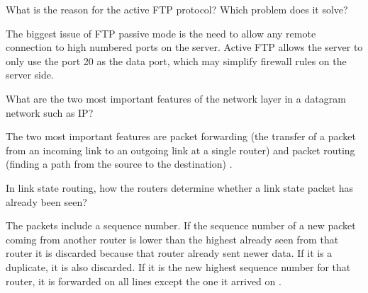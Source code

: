 \begin{Exercise}
\end{Exercise}

\begin{Exercise}
\end{Exercise}

\begin{Exercise}
What is the reason for the active FTP protocol? Which problem does it solve?
\end{Exercise}
\begin{Answer}
The biggest issue of FTP passive mode is the need to allow any remote connection to high numbered ports on the server. Active FTP allows the server to only use the port 20 as the data port, which may simplify firewall rules on the server side.
\end{Answer}

\begin{Exercise}
What are the two most important features of the network layer in a datagram network such as IP?
\end{Exercise}
\begin{Answer}
The two most important features are packet forwarding (the transfer of a packet from an incoming link to an outgoing link at a single router) and packet routing (finding a path from the source to the destination) \cite[p.~305]{computer-networking-kurose-2012}.
\end{Answer}

\begin{Exercise}
In link state routing, how the routers determine whether a link state packet has already been seen?
\end{Exercise}
\begin{Answer}
The packets include a sequence number. If the sequence number of a new packet coming from another router is lower than the highest already seen from that router it is discarded because that router already sent newer data. If it is a duplicate, it is also discarded. If it is the new highest sequence number for that router, it is forwarded on all lines except the one it arrived on \cite[p.~376]{computer-networks-tanenbaum-2012}.
\end{Answer}

\begin{Exercise}
\end{Exercise}

\begin{Exercise}
\end{Exercise}

